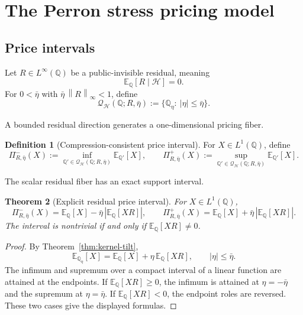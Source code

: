\documentclass[11pt,a4paper]{amsart}
\theoremstyle{plain}
\newtheorem{theorem}{Theorem}[section]
\theoremstyle{definition}
\newtheorem{definition}[theorem]{Definition}
\theoremstyle{remark}
\newcommand{\QQ}{\mathbb{Q}}
\newcommand{\EE}{\mathbb{E}}
\newcommand{\cH}{\mathcal{H}}
\newcommand{\cQ}{\mathcal{Q}}
\newcommand{\norm}[1]{\left\lVert #1\right\rVert}
\begin{document}
\section{The Perron stress pricing model}\label{sec:pricing-model}

\subsection{Price intervals}

Let \(R\in L^\infty(\QQ)\) be a public-invisible residual, meaning
\[
        \EE_\QQ[R\mid\cH]=0.
\]
For \(0<\bar\eta\) with \(\bar\eta\,\norm{R}_\infty<1\), define
\[
        \cQ_{\cH}(\QQ;R,\bar\eta)
        :=
        \{\QQ_\eta:\ |\eta|\le \bar\eta\}.
\]

A bounded residual direction generates a one-dimensional pricing fiber.

\begin{definition}[Compression-consistent price interval]\label{def:price-interval}
For \(X\in L^1(\QQ)\), define
\[
        \Pi_{R,\bar\eta}^{-}(X)
        :=
        \inf_{\QQ'\in\cQ_{\cH}(\QQ;R,\bar\eta)}
        \EE_{\QQ'}[X],
        \qquad
        \Pi_{R,\bar\eta}^{+}(X)
        :=
        \sup_{\QQ'\in\cQ_{\cH}(\QQ;R,\bar\eta)}
        \EE_{\QQ'}[X].
\]
\end{definition}

The scalar residual fiber has an exact support interval.

\begin{theorem}[Explicit residual price interval]\label{thm:price-interval}
For \(X\in L^1(\QQ)\),
\[
        \Pi_{R,\bar\eta}^{-}(X)
        =
        \EE_\QQ[X]
        -
        \bar\eta\,|\EE_\QQ[XR]|,
        \qquad
        \Pi_{R,\bar\eta}^{+}(X)
        =
        \EE_\QQ[X]
        +
        \bar\eta\,|\EE_\QQ[XR]|.
\]
The interval is nontrivial if and only if \(\EE_\QQ[XR]\ne0\).
\end{theorem}

\begin{proof}
By Theorem~\ref{thm:kernel-tilt},
\[
        \EE_{\QQ_\eta}[X]
        =
        \EE_\QQ[X]+\eta\,\EE_\QQ[XR],
        \qquad |\eta|\le\bar\eta.
\]
The infimum and supremum over a compact interval of a linear function are attained at the endpoints.
If \(\EE_\QQ[XR]\ge0\), the infimum is attained at \(\eta=-\bar\eta\) and the supremum at
\(\eta=\bar\eta\).  If \(\EE_\QQ[XR]<0\), the endpoint roles are reversed.  These two cases give
the displayed formulas.
\end{proof}
\end{document}
